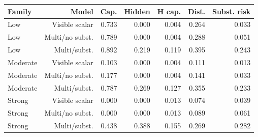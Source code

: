 \begingroup
\begin{center}
\begin{minipage}{\textwidth}
\centering
\scriptsize
\setlength{\tabcolsep}{1.5pt}
\begin{tabular*}{\textwidth}{@{\extracolsep{\fill}}lrrrrrr@{}}
\toprule
Family & Model & Cap. & Hidden & H cap. & Dist. & Subst. risk \\
\midrule
Low & Visible scalar & 0.733 & 0.000 & 0.004 & 0.264 & 0.033 \\
Low & Multi/no subst. & 0.789 & 0.000 & 0.004 & 0.288 & 0.051 \\
Low & Multi/subst. & 0.892 & 0.219 & 0.119 & 0.395 & 0.243 \\
Moderate & Visible scalar & 0.103 & 0.000 & 0.004 & 0.111 & 0.013 \\
Moderate & Multi/no subst. & 0.177 & 0.000 & 0.004 & 0.141 & 0.033 \\
Moderate & Multi/subst. & 0.787 & 0.269 & 0.127 & 0.355 & 0.233 \\
Strong & Visible scalar & 0.000 & 0.000 & 0.013 & 0.074 & 0.039 \\
Strong & Multi/no subst. & 0.000 & 0.000 & 0.013 & 0.089 & 0.061 \\
Strong & Multi/subst. & 0.438 & 0.388 & 0.155 & 0.269 & 0.282 \\
\bottomrule
\end{tabular*}
\par\smallskip
\captionsetup{hypcap=false}
\label{tab:mechanism-comparison}
\end{minipage}
\end{center}
\endgroup
